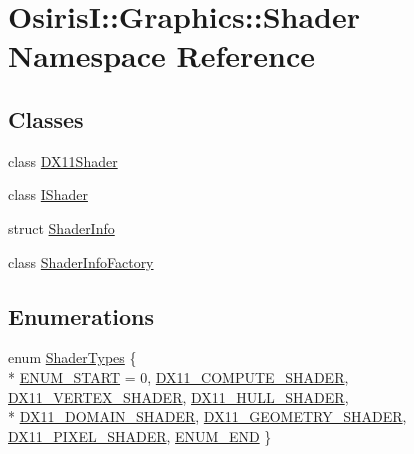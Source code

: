 \hypertarget{namespace_osiris_i_1_1_graphics_1_1_shader}{\section{Osiris\-I\-:\-:Graphics\-:\-:Shader Namespace Reference}
\label{namespace_osiris_i_1_1_graphics_1_1_shader}
}
\subsection*{Classes}
\begin{DoxyCompactItemize}
\item 
class \hyperlink{class_osiris_i_1_1_graphics_1_1_shader_1_1_d_x11_shader}{D\-X11\-Shader}
\item 
class \hyperlink{class_osiris_i_1_1_graphics_1_1_shader_1_1_i_shader}{I\-Shader}
\item 
struct \hyperlink{struct_osiris_i_1_1_graphics_1_1_shader_1_1_shader_info}{Shader\-Info}
\item 
class \hyperlink{class_osiris_i_1_1_graphics_1_1_shader_1_1_shader_info_factory}{Shader\-Info\-Factory}
\end{DoxyCompactItemize}
\subsection*{Enumerations}
\begin{DoxyCompactItemize}
\item 
enum \hyperlink{namespace_osiris_i_1_1_graphics_1_1_shader_a337cc6333eff5c701288da2fb4fd9cec}{Shader\-Types} \{ \\*
\hyperlink{namespace_osiris_i_1_1_graphics_1_1_shader_a337cc6333eff5c701288da2fb4fd9cecafe61327dd62140572b3d7d7daf4c3922}{E\-N\-U\-M\-\_\-\-S\-T\-A\-R\-T} = 0, 
\hyperlink{namespace_osiris_i_1_1_graphics_1_1_shader_a337cc6333eff5c701288da2fb4fd9ceca4cf5a4b81be138617b6759196fd21af4}{D\-X11\-\_\-\-C\-O\-M\-P\-U\-T\-E\-\_\-\-S\-H\-A\-D\-E\-R}, 
\hyperlink{namespace_osiris_i_1_1_graphics_1_1_shader_a337cc6333eff5c701288da2fb4fd9ceca0fa920e01b5dbe113ba2110ae1c89304}{D\-X11\-\_\-\-V\-E\-R\-T\-E\-X\-\_\-\-S\-H\-A\-D\-E\-R}, 
\hyperlink{namespace_osiris_i_1_1_graphics_1_1_shader_a337cc6333eff5c701288da2fb4fd9ceca0b2aab7a3936ed32f4a075010896eef7}{D\-X11\-\_\-\-H\-U\-L\-L\-\_\-\-S\-H\-A\-D\-E\-R}, 
\\*
\hyperlink{namespace_osiris_i_1_1_graphics_1_1_shader_a337cc6333eff5c701288da2fb4fd9cecad56c049814c8cba1a6e45d83fe9c4922}{D\-X11\-\_\-\-D\-O\-M\-A\-I\-N\-\_\-\-S\-H\-A\-D\-E\-R}, 
\hyperlink{namespace_osiris_i_1_1_graphics_1_1_shader_a337cc6333eff5c701288da2fb4fd9ceca18f4cb8f4a86c2296d8393c672b2f6ac}{D\-X11\-\_\-\-G\-E\-O\-M\-E\-T\-R\-Y\-\_\-\-S\-H\-A\-D\-E\-R}, 
\hyperlink{namespace_osiris_i_1_1_graphics_1_1_shader_a337cc6333eff5c701288da2fb4fd9cecafab0a929695c67b2609e4b3d60ae99fc}{D\-X11\-\_\-\-P\-I\-X\-E\-L\-\_\-\-S\-H\-A\-D\-E\-R}, 
\hyperlink{namespace_osiris_i_1_1_graphics_1_1_shader_a337cc6333eff5c701288da2fb4fd9ceca99227fc6141d771ca7deb903e65c7928}{E\-N\-U\-M\-\_\-\-E\-N\-D}
 \}
\end{DoxyCompactItemize}


